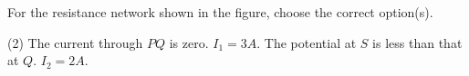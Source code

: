
\item For the resistance network shown in the figure, choose the correct option(s).
    \begin{center}
    \end{center}
    \begin{tasks}(2)
        \task The current through \( PQ \) is zero.
        \task \( I_1 = 3A \).
        \task The potential at \( S \) is less than that at \( Q \).
        \task \( I_2 = 2A \).
    \end{tasks}
